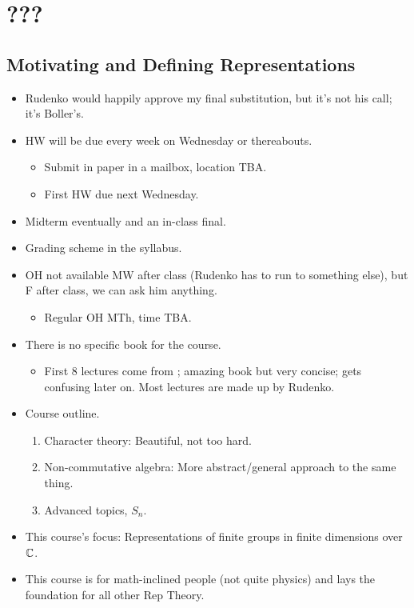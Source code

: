 \documentclass[../notes.tex]{subfiles}
\begin{document}
\chapter{???}
\section{Motivating and Defining Representations}
\begin{itemize}
    \item {}Rudenko would happily approve my final substitution, but it's not his call; it's Boller's.
    \item HW will be due every week on Wednesday or thereabouts.
    \begin{itemize}
        \item Submit in paper in a mailbox, location TBA.
        \item First HW due next Wednesday.
    \end{itemize}
    \item Midterm eventually and an in-class final.
    \item Grading scheme in the syllabus.
    \item OH not available MW after class (Rudenko has to run to something else), but F after class, we can ask him anything.
    \begin{itemize}
        \item Regular OH MTh, time TBA.
    \end{itemize}
    \item There is no specific book for the course.
    \begin{itemize}
        \item First 8 lectures come from \textcite{bib:Serre}; amazing book but very concise; gets confusing later on. Most lectures are made up by Rudenko.
    \end{itemize}
    \item Course outline.
    \begin{enumerate}
        \item Character theory: Beautiful, not too hard.
        \item Non-commutative algebra: More abstract/general approach to the same thing.
        \item Advanced topics, $S_n$.
    \end{enumerate}
    \item This course's focus: Representations of finite groups in finite dimensions over $\mathbb{C}$.
    \item This course is for math-inclined people (not quite physics) and lays the foundation for all other Rep Theory.

\end{itemize}
\end{document}
